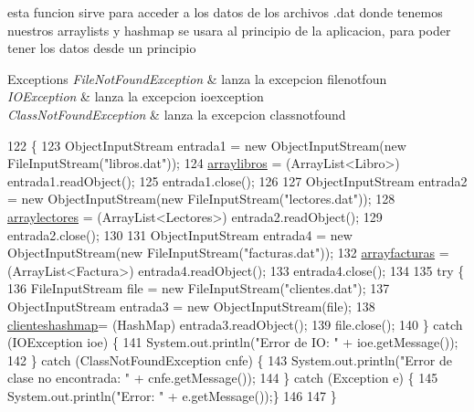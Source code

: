 esta funcion sirve para acceder a los datos de los archivos .dat donde tenemos nuestros arraylists y hashmap se usara al principio de la aplicacion, para poder tener los datos desde un principio


\begin{DoxyExceptions}{Exceptions}
{\em File\+Not\+Found\+Exception} & lanza la excepcion filenotfoun \\
\hline
{\em I\+O\+Exception} & lanza la excepcion ioexception \\
\hline
{\em Class\+Not\+Found\+Exception} & lanza la excepcion classnotfound \\
\hline
\end{DoxyExceptions}

\begin{DoxyCode}
122                                                                                                         \{
123          ObjectInputStream entrada1 = \textcolor{keyword}{new} ObjectInputStream(\textcolor{keyword}{new} FileInputStream(\textcolor{stringliteral}{"libros.dat"}));
124          \mbox{\hyperlink{classlibreria_1_1_libreria_aa55c2bad2db92eb94ea1ba9c6997f47d}{arraylibros}} = (ArrayList<Libro>) entrada1.readObject();
125          entrada1.close();
126          
127          ObjectInputStream entrada2 = \textcolor{keyword}{new} ObjectInputStream(\textcolor{keyword}{new} FileInputStream(\textcolor{stringliteral}{"lectores.dat"}));
128          \mbox{\hyperlink{classlibreria_1_1_libreria_ac9e002dcb370eb6caa314d18cf14a293}{arraylectores}} = (ArrayList<Lectores>) entrada2.readObject();
129          entrada2.close();
130          
131          ObjectInputStream entrada4 = \textcolor{keyword}{new} ObjectInputStream(\textcolor{keyword}{new} FileInputStream(\textcolor{stringliteral}{"facturas.dat"}));
132          \mbox{\hyperlink{classlibreria_1_1_libreria_a1b6aaea2b6d1d95a7e25b85881e82721}{arrayfacturas}} = (ArrayList<Factura>) entrada4.readObject();
133          entrada4.close();
134         
135         \textcolor{keywordflow}{try} \{
136             FileInputStream file = \textcolor{keyword}{new} FileInputStream(\textcolor{stringliteral}{"clientes.dat"});
137             ObjectInputStream entrada3 = \textcolor{keyword}{new} ObjectInputStream(file);
138             \mbox{\hyperlink{classlibreria_1_1_libreria_a9bb86627af6c43f97367c8a28d9f0d3e}{clienteshashmap}}= (HashMap) entrada3.readObject();
139             file.close();
140         \} \textcolor{keywordflow}{catch} (IOException ioe) \{
141             System.out.println(\textcolor{stringliteral}{"Error de IO: "} + ioe.getMessage());
142         \} \textcolor{keywordflow}{catch} (ClassNotFoundException cnfe) \{
143             System.out.println(\textcolor{stringliteral}{"Error de clase no encontrada: "} + cnfe.getMessage());
144         \} \textcolor{keywordflow}{catch} (Exception e) \{
145             System.out.println(\textcolor{stringliteral}{"Error: "} + e.getMessage());\}
146          
147      \}
\end{DoxyCode}
